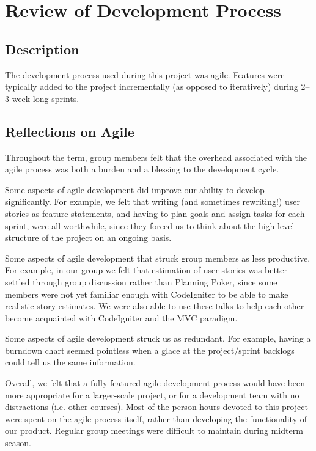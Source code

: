 \documentclass[12pt]{article}
\begin{document}
\section{Review of Development Process}

\subsection{Description}

The development process used during this project was agile. Features were typically added to the
project incrementally (as opposed to iteratively) during 2--3 week long sprints.


\subsection{Reflections on Agile}

Throughout the term, group members felt that the overhead associated with the agile process was both
a burden and a blessing to the development cycle.

Some aspects of agile development did improve our ability to develop significantly. For example, we
felt that writing (and sometimes rewriting!) user stories as feature statements, and having to plan
goals and assign tasks for each sprint, were all worthwhile, since they forced us to think about the
high-level structure of the project on an ongoing basis.

Some aspects of agile development that struck group members as less
productive. For example, in our group we felt that estimation of user stories was better settled
through group discussion rather than Planning Poker, since some members were not yet familiar enough
with CodeIgniter to be able to make realistic story estimates. We were also able to use these talks
to help each other become acquainted with CodeIgniter and the MVC paradigm.

Some aspects of agile development struck us as redundant. For example, having a burndown chart 
seemed pointless when a glace at the project/sprint backlogs could tell us the same information.

Overall, we felt that a fully-featured agile development process would have been more appropriate
for a larger-scale project, or for a development team with no distractions (i.e. other courses).
Most of the person-hours devoted to this project were spent on the agile process itself, rather
than developing the functionality of our product. Regular group meetings were difficult to maintain
during midterm season.
\end{document}
